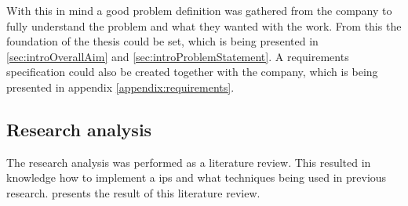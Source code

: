 \bigskip

With this in mind a good problem definition was gathered from the company to fully understand the problem and what they wanted with the work.
From this the foundation of the thesis could be set, which is being presented in \cref{sec:introOverallAim} and \ref{sec:introProblemStatement}.
A requirements specification could also be created together with the company, which is being presented in appendix \ref{appendix:requirements}.

\subsection{Research analysis}\label{sec:methodResearchAnalysis}
The research analysis was performed as a literature review. 
This resulted in knowledge how to implement a \acrshort{ips} and what techniques being used in previous research.
 presents the result of this literature review.
